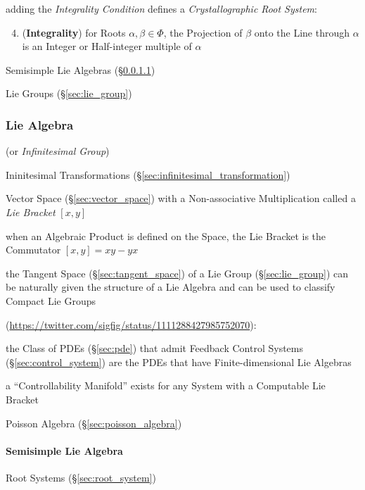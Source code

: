 adding the \emph{Integrality Condition} defines a \emph{Crystallographic Root
  System}:
\begin{enumerate}
  \setcounter{enumi}{3}
  \item (\textbf{Integrality}) for Roots $\alpha, \beta \in \Phi$, the
    Projection of $\beta$ onto the Line through $\alpha$ is an Integer or
    Half-integer multiple of $\alpha$
\end{enumerate}

Semisimple Lie Algebras (\S\ref{sec:semisimple_lie})

Lie Groups (\S\ref{sec:lie_group})



\subsubsection{Lie Algebra}\label{sec:lie_algebra}

(or \emph{Infinitesimal Group})

Ininitesimal Transformations
(\S\ref{sec:infinitesimal_transformation})

Vector Space (\S\ref{sec:vector_space}) with a Non-associative
Multiplication called a \emph{Lie Bracket} $[x,y]$

when an Algebraic Product is defined on the Space, the Lie Bracket is
the Commutator $[x,y] = xy - yx$ %

the Tangent Space (\S\ref{sec:tangent_space}) of a Lie Group
(\S\ref{sec:lie_group}) can be naturally given the structure of a Lie Algebra
and can be used to classify Compact Lie Groups

(\url{https://twitter.com/sigfig/status/1111288427985752070}):

the Class of PDEs (\S\ref{sec:pde}) that admit Feedback Control Systems
(\S\ref{sec:control_system}) are the PDEs that have Finite-dimensional Lie
Algebras

a ``Controllability Manifold'' exists for any System with a Computable Lie
Bracket

Poisson Algebra (\S\ref{sec:poisson_algebra})



\paragraph{Semisimple Lie Algebra}\label{sec:semisimple_lie}\hfill

Root Systems (\S\ref{sec:root_system})



